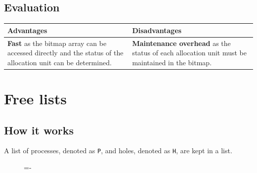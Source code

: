 \documentclass[a4paper]{systems-software}
\begin{document}
\subsection*{Evaluation}

\begin{longtabu} to \textwidth {| X[1,l] | X[1,l] |}
    \hline
    \textbf{Advantages} & \textbf{Disadvantages}
	\\ \hline
	\textbf{Fast} as the bitmap array can be accessed directly and the status of the allocation unit can be determined. & \textbf{Maintenance overhead} as the status of each allocation unit must be maintained in the bitmap. 
	\\ \hline
\end{longtabu}


\newpage

\section*{Free lists}

\subsection*{How it works}

A list of processes, denoted as \texttt{P}, and holes, denoted as \texttt {H}, are kept in a list.

\begin{figure}[H]
  \lineskip=-\fboxrule
\end{figure}
\end{document}
